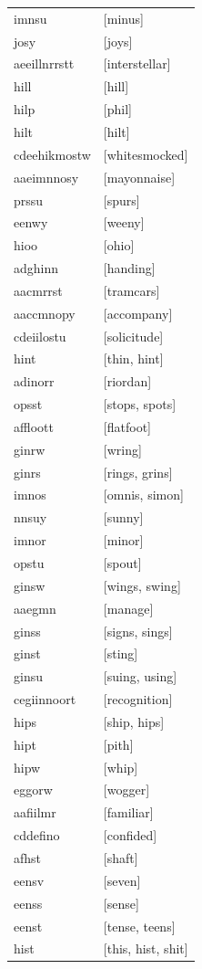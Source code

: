 \documentclass{article}
\begin{document}
\begin{tabular}{ll}
imnsu & [minus] \\
josy & [joys] \\
aeeillnrrstt & [interstellar] \\
hill & [hill] \\
hilp & [phil] \\
hilt & [hilt] \\
cdeehikmostw & [whitesmocked] \\
aaeimnnosy & [mayonnaise] \\
prssu & [spurs] \\
eenwy & [weeny] \\
hioo & [ohio] \\
adghinn & [handing] \\
aacmrrst & [tramcars] \\
aaccmnopy & [accompany] \\
cdeiilostu & [solicitude] \\
hint & [thin, hint] \\
adinorr & [riordan] \\
opsst & [stops, spots] \\
affloott & [flatfoot] \\
ginrw & [wring] \\
ginrs & [rings, grins] \\
imnos & [omnis, simon] \\
nnsuy & [sunny] \\
imnor & [minor] \\
opstu & [spout] \\
ginsw & [wings, swing] \\
aaegmn & [manage] \\
ginss & [signs, sings] \\
ginst & [sting] \\
ginsu & [suing, using] \\
cegiinnoort & [recognition] \\
hips & [ship, hips] \\
hipt & [pith] \\
hipw & [whip] \\
eggorw & [wogger] \\
aafiilmr & [familiar] \\
cddefino & [confided] \\
afhst & [shaft] \\
eensv & [seven] \\
eenss & [sense] \\
eenst & [tense, teens] \\
hist & [this, hist, shit] \\

\end{tabular}
\end{document}
